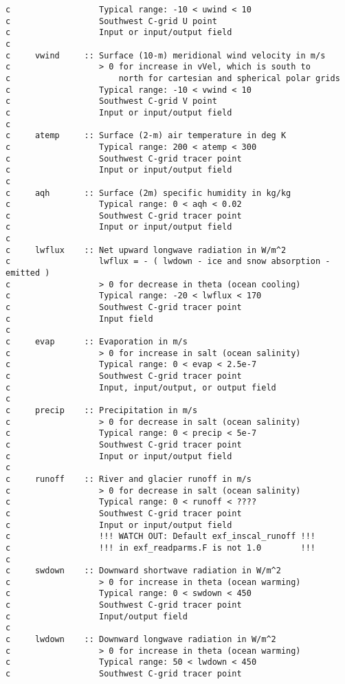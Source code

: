 {\begin{verbatim}
c                  Typical range: -10 < uwind < 10
c                  Southwest C-grid U point
c                  Input or input/output field
c
c     vwind     :: Surface (10-m) meridional wind velocity in m/s
c                  > 0 for increase in vVel, which is south to
c                      north for cartesian and spherical polar grids
c                  Typical range: -10 < vwind < 10
c                  Southwest C-grid V point
c                  Input or input/output field
c
c     atemp     :: Surface (2-m) air temperature in deg K
c                  Typical range: 200 < atemp < 300
c                  Southwest C-grid tracer point
c                  Input or input/output field
c
c     aqh       :: Surface (2m) specific humidity in kg/kg
c                  Typical range: 0 < aqh < 0.02
c                  Southwest C-grid tracer point
c                  Input or input/output field
c
c     lwflux    :: Net upward longwave radiation in W/m^2
c                  lwflux = - ( lwdown - ice and snow absorption - emitted )
c                  > 0 for decrease in theta (ocean cooling)
c                  Typical range: -20 < lwflux < 170
c                  Southwest C-grid tracer point
c                  Input field
c
c     evap      :: Evaporation in m/s
c                  > 0 for increase in salt (ocean salinity)
c                  Typical range: 0 < evap < 2.5e-7
c                  Southwest C-grid tracer point
c                  Input, input/output, or output field
c
c     precip    :: Precipitation in m/s
c                  > 0 for decrease in salt (ocean salinity)
c                  Typical range: 0 < precip < 5e-7
c                  Southwest C-grid tracer point
c                  Input or input/output field
c
c     runoff    :: River and glacier runoff in m/s
c                  > 0 for decrease in salt (ocean salinity)
c                  Typical range: 0 < runoff < ????
c                  Southwest C-grid tracer point
c                  Input or input/output field
c                  !!! WATCH OUT: Default exf_inscal_runoff !!!
c                  !!! in exf_readparms.F is not 1.0        !!!
c
c     swdown    :: Downward shortwave radiation in W/m^2
c                  > 0 for increase in theta (ocean warming)
c                  Typical range: 0 < swdown < 450
c                  Southwest C-grid tracer point
c                  Input/output field
c
c     lwdown    :: Downward longwave radiation in W/m^2
c                  > 0 for increase in theta (ocean warming)
c                  Typical range: 50 < lwdown < 450
c                  Southwest C-grid tracer point

\end{verbatim}}
